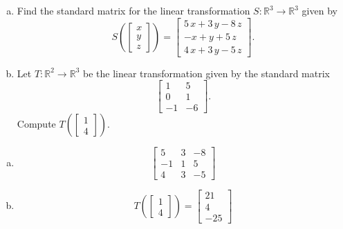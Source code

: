 
\begin{exerciseStatement}

\begin{enumerate}[(a)]
\item Find the standard matrix for the linear transformation \(S:\mathbb{R}^ 3  \to \mathbb{R}^ 3 \) given by \[S\left(  \left[\begin{array}{c}
x \\
y \\
z
\end{array}\right]  \right) =  \left[\begin{array}{c}
5 \, x + 3 \, y - 8 \, z \\
-x + y + 5 \, z \\
4 \, x + 3 \, y - 5 \, z
\end{array}\right] .\]
\item Let \(T:\mathbb{R}^ 2  \to \mathbb{R}^ 3 \) be the linear transformation given by the standard matrix \[ \left[\begin{array}{cc}
1 & 5 \\
0 & 1 \\
-1 & -6
\end{array}\right] .\] Compute \(T\left( \left[\begin{array}{c}
1 \\
4
\end{array}\right]  \right)\). 
\end{enumerate}
    
\end{exerciseStatement}
    
\begin{exerciseAnswer} 

\begin{enumerate}[(a)]
\item \[ \left[\begin{array}{ccc}
5 & 3 & -8 \\
-1 & 1 & 5 \\
4 & 3 & -5
\end{array}\right] \]
\item \[T\left( \left[\begin{array}{c}
1 \\
4
\end{array}\right]  \right)= \left[\begin{array}{c}
21 \\
4 \\
-25
\end{array}\right] \]
\end{enumerate}
    
\end{exerciseAnswer}
    
